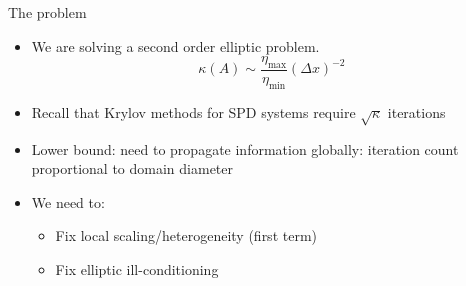 \begin{frame}{The problem}
  \begin{itemize}
  \item We are solving a second order elliptic problem.
    \begin{equation*}
      \kappa(A) \sim \frac{\eta_{\max}}{\eta_{\min}} (\Delta x)^{-2}
    \end{equation*}
  \item Recall that Krylov methods for SPD systems require $\sqrt{\kappa}$ iterations
  \item Lower bound: need to propagate information globally: iteration count proportional to domain diameter
  \item We need to:
    \begin{itemize}
    \item Fix local scaling/heterogeneity (first term)
    \item Fix elliptic ill-conditioning
    \end{itemize}
  \end{itemize}
\end{frame}






